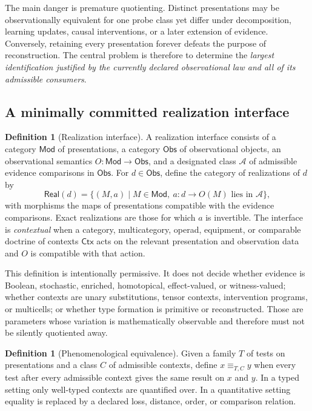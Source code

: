 \documentclass[11pt]{article}
\theoremstyle{definition}
\newtheorem{definition}[theorem]{Definition}
\theoremstyle{remark}
\newcommand{\Real}{\mathsf{Real}}
\newcommand{\Obs}{\mathsf{Obs}}
\newcommand{\Mod}{\mathsf{Mod}}
\newcommand{\Ctx}{\mathsf{Ctx}}
\begin{document}
The main danger is premature quotienting. Distinct presentations may be observationally equivalent for one probe class yet differ under decomposition, learning updates, causal interventions, or a later extension of evidence. Conversely, retaining every presentation forever defeats the purpose of reconstruction. The central problem is therefore to determine the \emph{largest identification justified by the currently declared observational law and all of its admissible consumers}.

\subsection{A minimally committed realization interface}

\begin{definition}[Realization interface]
A realization interface consists of a category $\Mod$ of presentations, a category $\Obs$ of observational objects, an observational semantics $O:\Mod\to\Obs$, and a designated class $\mathcal A$ of admissible evidence comparisons in $\Obs$. For $d\in\Obs$, define the category of realizations of $d$ by
\[
\Real(d)=\{(M,a)\mid M\in\Mod,\ a:d\to O(M)\text{ lies in }\mathcal A\},
\]
with morphisms the maps of presentations compatible with the evidence comparisons. Exact realizations are those for which $a$ is invertible. The interface is \emph{contextual} when a category, multicategory, operad, equipment, or comparable doctrine of contexts $\Ctx$ acts on the relevant presentation and observation data and $O$ is compatible with that action.
\end{definition}

This definition is intentionally permissive. It does not decide whether evidence is Boolean, stochastic, enriched, homotopical, effect-valued, or witness-valued; whether contexts are unary substitutions, tensor contexts, intervention programs, or multicells; or whether type formation is primitive or reconstructed. Those are parameters whose variation is mathematically observable and therefore must not be silently quotiented away.

\begin{definition}[Phenomenological equivalence]
Given a family $T$ of tests on presentations and a class $C$ of admissible contexts, define $x\equiv_{T,C}y$ when every test after every admissible context gives the same result on $x$ and $y$. In a typed setting only well-typed contexts are quantified over. In a quantitative setting equality is replaced by a declared loss, distance, order, or comparison relation.
\end{definition}
\end{document}

